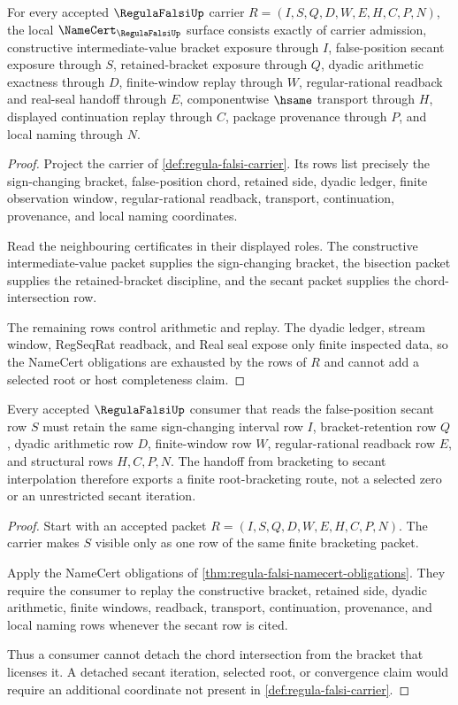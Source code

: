 \begin{theorem}
\label{thm:regula-falsi-namecert-obligations}
For every accepted $\RegulaFalsiUp$ carrier $R=(I,S,Q,D,W,E,H,C,P,N)$, the local $\NameCert_{\RegulaFalsiUp}$ surface consists exactly of carrier admission, constructive intermediate-value bracket exposure through $I$, false-position secant exposure through $S$, retained-bracket exposure through $Q$, dyadic arithmetic exactness through $D$, finite-window replay through $W$, regular-rational readback and real-seal handoff through $E$, componentwise $\hsame$ transport through $H$, displayed continuation replay through $C$, package provenance through $P$, and local naming through $N$.
\end{theorem}
\begin{proof}
Project the carrier of \autoref{def:regula-falsi-carrier}. Its rows list precisely the sign-changing bracket, false-position chord, retained side, dyadic ledger, finite observation window, regular-rational readback, transport, continuation, provenance, and local naming coordinates.

Read the neighbouring certificates in their displayed roles. The constructive intermediate-value packet supplies the sign-changing bracket, the bisection packet supplies the retained-bracket discipline, and the secant packet supplies the chord-intersection row.

The remaining rows control arithmetic and replay. The dyadic ledger, stream window, RegSeqRat readback, and Real seal expose only finite inspected data, so the NameCert obligations are exhausted by the rows of $R$ and cannot add a selected root or host completeness claim.
\end{proof}

\begin{theorem}
\label{thm:regula-falsi-bracket-secant-handoff}
Every accepted $\RegulaFalsiUp$ consumer that reads the false-position secant row $S$ must retain the same sign-changing interval row $I$, bracket-retention row $Q$, dyadic arithmetic row $D$, finite-window row $W$, regular-rational readback row $E$, and structural rows $H,C,P,N$. The handoff from bracketing to secant interpolation therefore exports a finite root-bracketing route, not a selected zero or an unrestricted secant iteration.
\end{theorem}
\begin{proof}
Start with an accepted packet $R=(I,S,Q,D,W,E,H,C,P,N)$. The carrier makes $S$ visible only as one row of the same finite bracketing packet.

Apply the NameCert obligations of \autoref{thm:regula-falsi-namecert-obligations}. They require the consumer to replay the constructive bracket, retained side, dyadic arithmetic, finite windows, readback, transport, continuation, provenance, and local naming rows whenever the secant row is cited.

Thus a consumer cannot detach the chord intersection from the bracket that licenses it. A detached secant iteration, selected root, or convergence claim would require an additional coordinate not present in \autoref{def:regula-falsi-carrier}.
\end{proof}

